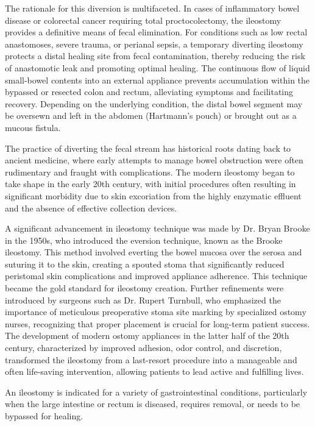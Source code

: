 The rationale for this diversion is multifaceted. In cases of inflammatory bowel disease or colorectal cancer requiring total proctocolectomy, the ileostomy provides a definitive means of fecal elimination. For conditions such as low rectal anastomoses, severe trauma, or perianal sepsis, a temporary diverting ileostomy protects a distal healing site from fecal contamination, thereby reducing the risk of anastomotic leak and promoting optimal healing. The continuous flow of liquid small-bowel contents into an external appliance prevents accumulation within the bypassed or resected colon and rectum, alleviating symptoms and facilitating recovery. Depending on the underlying condition, the distal bowel segment may be oversewn and left in the abdomen (Hartmann's pouch) or brought out as a mucous fistula.

The practice of diverting the fecal stream has historical roots dating back to ancient medicine, where early attempts to manage bowel obstruction were often rudimentary and fraught with complications. The modern ileostomy began to take shape in the early 20th century, with initial procedures often resulting in significant morbidity due to skin excoriation from the highly enzymatic effluent and the absence of effective collection devices.

A significant advancement in ileostomy technique was made by Dr. Bryan Brooke in the 1950s, who introduced the eversion technique, known as the Brooke ileostomy. This method involved everting the bowel mucosa over the serosa and suturing it to the skin, creating a spouted stoma that significantly reduced peristomal skin complications and improved appliance adherence. This technique became the gold standard for ileostomy creation. Further refinements were introduced by surgeons such as Dr. Rupert Turnbull, who emphasized the importance of meticulous preoperative stoma site marking by specialized ostomy nurses, recognizing that proper placement is crucial for long-term patient success. The development of modern ostomy appliances in the latter half of the 20th century, characterized by improved adhesion, odor control, and discretion, transformed the ileostomy from a last-resort procedure into a manageable and often life-saving intervention, allowing patients to lead active and fulfilling lives.

An ileostomy is indicated for a variety of gastrointestinal conditions, particularly when the large intestine or rectum is diseased, requires removal, or needs to be bypassed for healing.


